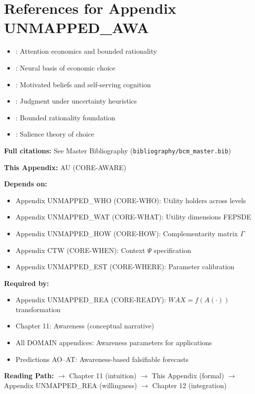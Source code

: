 \section{References for Appendix UNMAPPED_AWA}
\label{sec:au-references}

\begin{itemize}[nosep]
    \item \citet{kahneman2003}: Attention economics and bounded rationality
    \item \citet{rangel2008}: Neural basis of economic choice
    \item \citet{fehrrangel2011}: Motivated beliefs and self-serving cognition
    \item \citet{tversky1974}: Judgment under uncertainty heuristics
    \item \citet{simon1955}: Bounded rationality foundation
    \item \citet{bordalo2012}: Salience theory of choice
\end{itemize}

\textbf{Full citations:} See Master Bibliography (\texttt{bibliography/bcm\_master.bib})


\begin{tcolorbox}[colback=gray!10!white, colframe=gray!75!black,
    title=\textbf{Cross-Reference Footer}]

\textbf{This Appendix:} AU (CORE-AWARE)

\textbf{Depends on:}
\begin{itemize}[nosep]
    \item Appendix UNMAPPED_WHO (CORE-WHO): Utility holders across levels
    \item Appendix UNMAPPED_WAT (CORE-WHAT): Utility dimensions FEPSDE
    \item Appendix UNMAPPED_HOW (CORE-HOW): Complementarity matrix $\Gamma$
    \item Appendix CTW (CORE-WHEN): Context $\Psi$ specification
    \item Appendix UNMAPPED_EST (CORE-WHERE): Parameter calibration
\end{itemize}

\textbf{Required by:}
\begin{itemize}[nosep]
    \item Appendix UNMAPPED_REA (CORE-READY): $WAX = f(A(\cdot))$ transformation
    \item Chapter 11: Awareness (conceptual narrative)
    \item All DOMAIN appendices: Awareness parameters for applications
    \item Predictions AO--AT: Awareness-based falsifiable forecasts
\end{itemize}

\textbf{Reading Path:}
$\rightarrow$ Chapter 11 (intuition) $\rightarrow$ This Appendix (formal)
$\rightarrow$ Appendix UNMAPPED_REA (willingness) $\rightarrow$ Chapter 12 (integration)

\end{tcolorbox}

